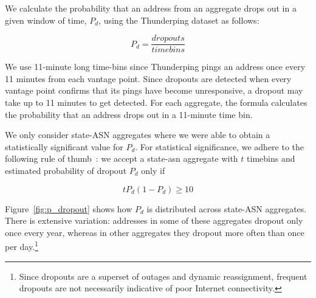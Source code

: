We calculate the probability that an address from an aggregate drops
out in a given window of time, $P_d$, using the Thunderping
dataset as follows:

\begin{equation}
P_d= \frac{dropouts}{timebins}
\label{eq:p_dropout}
\end{equation}

We use 11-minute long time-bins since Thunderping pings an address
once every 11 minutes from each vantage point. Since dropouts are
detected when every vantage point confirms that its pings have become
unresponsive, a dropout may take up to 11 minutes to get detected. For
each aggregate, the formula calculates the probability that an address
drops out in a 11-minute time bin.

We only consider state-ASN aggregates where we were able to obtain a
statistically significant value for $P_d$. For statistical
significance, we adhere to the following rule of
thumb~\cite[Chapter~6]{biostats-book}: we accept a state-asn aggregate with $t$ timebins
and estimated probability of dropout $P_d$ only if 

\begin{equation}
	tP_d(1-P_d) \geq 10
	\label{eq:stat_sig}
\end{equation}



Figure~\ref{fig:p_dropout} shows how $P_d$ is distributed across
state-ASN aggregates. There is extensive 
variation: addresses in some of these aggregates dropout only once every
year, whereas in other aggregates they dropout more often than once per
day.\footnote{Since dropouts are a superset of outages and dynamic
  reassignment, frequent dropouts are not necessarily indicative of
  poor Internet connectivity.} %

